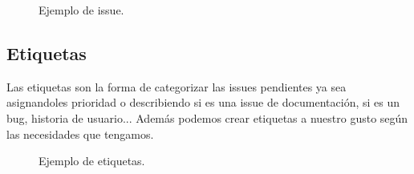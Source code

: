 \begin{figure}[H]
	\centering
	\noindent{}
	\caption{Ejemplo de issue.}
  \end{figure}

\subsection{Etiquetas}

Las etiquetas son la forma de categorizar las issues pendientes ya sea asignandoles prioridad o describiendo si es una issue de documentación, si es un bug, historia de usuario...
Además podemos crear etiquetas a nuestro gusto según las necesidades que tengamos.

\begin{figure}[H]
	\centering
	\noindent{}
	\caption{Ejemplo de etiquetas.}
\end{figure}